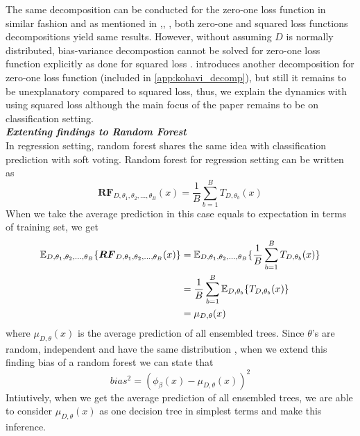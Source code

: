 The same decomposition can be conducted for the zero-one loss function in similar fashion and as mentioned in 
\cite{louppe2014understanding},\cite{domingos2000decomposition}, 
\cite{james2003variance}, \cite{friedman1997zeroLoss}
both zero-one and squared loss functions decompositions yield same results. 
However, without assuming $D$ is normally distributed, bias-variance decompostion 
cannot be solved for zero-one loss function explicitly as done for squared loss \cite{louppe2014understanding}. 
\cite{kohavi1996bias} introduces another decomposition for zero-one loss function (included in \autoref{app:kohavi_decomp}), 
but still it remains to be unexplanatory compared to squared loss, thus, 
we explain the dynamics with using squared loss although the main focus of the paper remains to be on classification setting.
\vspace{2mm}
\\
\textbf{\emph{Extenting findings to Random Forest }}\\
In regression setting, random forest shares the same idea with classification prediction with soft voting. 
Random forest for regression setting can be written as
\begin{equation}
\boldsymbol{RF}_{D, \theta_{1},\theta_{2},..., \theta_{B}}(x) = \dfrac{1}{B}\sum_{b = 1}^{B}T_{D,\theta_{b}}(x)
\end{equation}
When we take the average prediction in this case equals to expectation in terms of training set, we get
\begin{align}\label{eq:mu}
\mathbb{E}_{D, \theta_{1}, \theta_{2},..., \theta_{B}}\{\boldsymbol{RF}_{D, \theta_{1},\theta_{2},..., \theta_{B}}(x) \} 
	& = \mathbb{E}_{D, \theta_{1}, \theta_{2},..., \theta_{B}}\{\dfrac{1}{B}\sum_{b = 1}^{B}T_{D,\theta_{b}}(x)\} \notag \\
	& = \dfrac{1}{B}\sum_{b=1}^{B}\mathbb{E}_{D,\theta_{b}}\{T_{D, \theta_{b}}(x)\}\notag \\
	& = \mu_{D,\theta}(x)
\end{align}
where $\mu_{D,\theta}(x)$ is the average prediction of all ensembled trees. Since $\theta$'s are random, 
independent and have the same distribution \cite{louppe2014understanding}, when we extend this finding bias of a random forest 
we can state that 
\begin{equation}\label{eq:random_forest_bias}
bias^2 = (\phi_{\beta}(x) - \mu_{D,\theta}(x))^2
\end{equation}
Intiutively, when we get the average prediction of all ensembled trees, 
we are able to consider $\mu_{D,\theta}(x)$ as one decision tree in simplest terms and make this inference.
